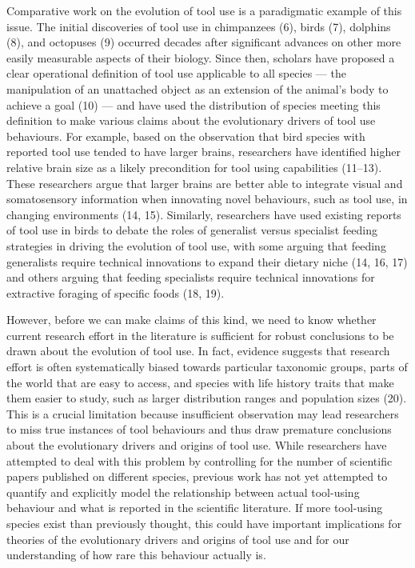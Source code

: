\documentclass[
  man, donotrepeattitle,floatsintext]{apa6}
\begin{document}
Comparative work on the evolution of tool use is a paradigmatic example of this
issue. The initial discoveries of tool use in chimpanzees (6),
birds (7), dolphins (8), and octopuses (9) occurred
decades after significant advances on other more easily measurable aspects of
their biology. Since then, scholars have proposed a clear operational
definition of tool use applicable to all species --- the manipulation of an
unattached object as an extension of the animal's body to achieve a
goal (10) --- and have used the distribution of species meeting this
definition to make various claims about the evolutionary drivers of tool use
behaviours. For example, based on the observation that bird species with
reported tool use tended to have larger brains, researchers have identified
higher relative brain size as a likely precondition for tool using
capabilities (11--13). These researchers
argue that larger brains are better able to integrate visual and somatosensory
information when innovating novel behaviours, such as tool use, in changing
environments (14, 15). Similarly, researchers have used existing
reports of tool use in birds to debate the roles of generalist versus
specialist feeding strategies in driving the evolution of tool use, with some
arguing that feeding generalists require technical innovations to expand their
dietary niche (14, 16, 17) and others arguing that
feeding specialists require technical innovations for extractive foraging of
specific foods (18, 19).

However, before we can make claims of this kind, we need to know whether current
research effort in the literature is sufficient for robust conclusions to be
drawn about the evolution of tool use. In fact, evidence suggests that research
effort is often systematically biased towards particular taxonomic groups, parts
of the world that are easy to access, and species with life history traits that
make them easier to study, such as larger distribution ranges and population
sizes (20). This is a crucial limitation because insufficient
observation may lead researchers to miss true instances of tool behaviours and
thus draw premature conclusions about the evolutionary drivers and origins of
tool use. While researchers have attempted to deal with this problem by
controlling for the number of scientific papers published on different species,
previous work has not yet attempted to quantify and explicitly model the
relationship between actual tool-using behaviour and what is reported in the
scientific literature. If more tool-using species exist than previously thought,
this could have important implications for theories of the evolutionary drivers
and origins of tool use and for our understanding of how rare this behaviour
actually is.
\end{document}
